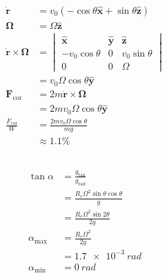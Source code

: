 \documentclass{article}
\renewcommand{\vec}[1]{\boldsymbol{\mathbf{#1}}}
\newcommand{\dvec}[1]{\dot{\vec{#1}}}
\newcommand{\uvec}[1]{\hat{\vec{#1}}}
\begin{document}
\begin{align*}
  \dvec{r}                     & = v_0 (-\cos \theta \uvec{x} + \sin \theta \uvec{z}) \\
  \vec{\Omega}                 & = \Omega \uvec{z}                                    \\
  \dvec{r} \times \vec{\Omega} & = \begin{vmatrix}
                                     \uvec{x}         & \uvec{y} & \uvec{z}        \\
                                     -v_0 \cos \theta & 0        & v_0 \sin \theta \\
                                     0                & 0        & \Omega
                                   \end{vmatrix}      \\
                               & = v_0 \Omega \cos \theta \uvec{y}                    \\
  \vec{F}_\text{cor}           & = 2 m \dvec{r} \times \vec{\Omega}                   \\
                               & = 2 m v_0 \Omega \cos \theta \uvec{y}                \\
  \frac{F_\text{cor}}{W}       & = \frac{2 m v_0 \Omega \cos \theta}{m g}             \\
                               & \approx 1.1\%
\end{align*}

\setcounter{subsection}{12}
\subsection{}

\begin{align*}
  \tan \alpha       & = \frac{g_\text{tan}}{g_\text{rad}}              \\
                    & = \frac{R_e \Omega^2 \sin \theta \cos \theta}{g} \\
                    & = \frac{R_e \Omega^2 \sin 2 \theta}{2 g}         \\
  \alpha_\text{max} & = \frac{R_e \Omega^2}{2 g}                       \\
                    & = \qty{1.7e-3}{rad}                              \\
  \alpha_\text{min} & = \qty{0}{rad}
\end{align*}

\setcounter{subsection}{18}
\subsection{}
\end{document}
